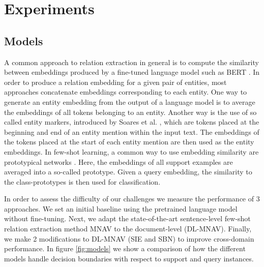 \documentclass[11pt]{article}
\begin{document}
\begin{figure*}
    \centering
    \caption{Embedding space illustration of the different models used for evaluation \textit{at inference time}. Shown in (a) are all data points available from support documents, as well as the query instance. Class prototypes in (b) are computed as mean of support relation instances. Learned NOTA vectors, shown in red, are not based on support NOTA instances but learned during training and do not change based on the support document. Dotted lines indicate distances affecting the classification of the query instance, shown in white. Background colors illustrate approximate classification boundaries. For the baseline model (\ref{subsection:baseline}), decision boundaries are the same as in (d).}
    \label{fig:models}
\end{figure*}
\section{Experiments}
\label{sec:experiments}
\subsection{Models}

A common approach to relation extraction in general is to compute the similarity between embeddings produced by a fine-tuned language model such as BERT \cite{devlin_bert_2019}. 
In order to produce a relation embedding for a given pair of entities, most approaches concatenate embeddings corresponding to each entity.
One way to generate an entity embedding from the output of a language model is to average the embeddings of all tokens belonging to an entity.
Another way is the use of so called entity markers, introduced by Soares et al. \cite{soares_matching_2019}, which are tokens placed at the beginning and end of an entity mention within the input text.
The embeddings of the tokens placed at the start of each entity mention are then used as the entity embeddings.
In few-shot learning, a common way to use embedding similarity are prototypical networks \cite{snell_prototypical_2017}. 
Here, the embeddings of all  support examples are averaged into a so-called prototype.
Given a query embedding, the similarity to the  class-prototypes is then used for classification.

In order to assess the difficulty of our challenges we measure the performance of 3 approaches.
We set an initial baseline using the pretrained language model  \cite{devlin_bert_2019} without fine-tuning.
Next, we adapt the state-of-the-art sentence-level few-shot relation extraction method MNAV \cite{sabo_revisiting_2021} to the document-level (DL-MNAV).
Finally, we make 2 modifications to DL-MNAV (SIE and SBN) to improve cross-domain performance.
In figure \ref{fig:models} we show a comparison of how the different models handle decision boundaries with respect to support and query instances.
\end{document}
